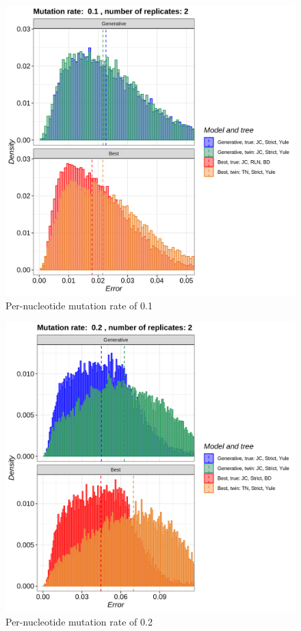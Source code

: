 \begin{figure}[H]
  \includegraphics[width=\textwidth]{pirouette_example_24/errors_4.png}
  \caption{Per-nucleotide mutation rate of 0.1}
\end{figure}

\begin{figure}[H]
  \includegraphics[width=\textwidth]{pirouette_example_24/errors_5.png}
  \caption{Per-nucleotide mutation rate of 0.2}
\end{figure}

